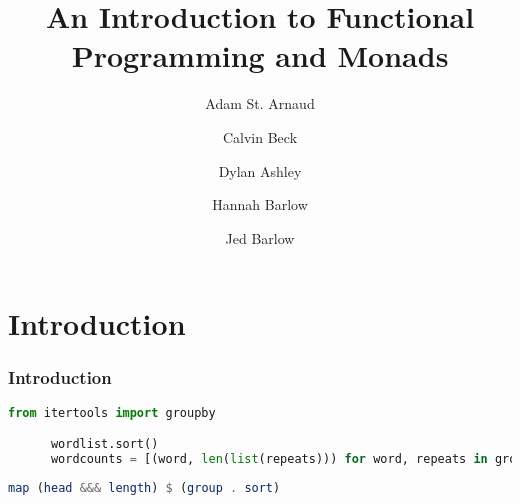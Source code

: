 \documentclass[]{beamer}
\title{An Introduction to Functional Programming and Monads}
\author{Adam St. Arnaud\\
  \and Calvin Beck\\
  \and Dylan Ashley\\
  \and Hannah Barlow\\
  \and Jed Barlow}
\begin{document}
\begin{frame}
\maketitle
\end{frame}

\section{Introduction}
\begin{frame}[fragile]
    \frametitle{Introduction}

    \begin{lstlisting}[frame=single,language=Python,breaklines=true]
      from itertools import groupby

      wordlist.sort()
      wordcounts = [(word, len(list(repeats))) for word, repeats in groupby(wordlist)]
    \end{lstlisting}

    \begin{lstlisting}[frame=single,language=Haskell,breaklines=true]
      map (head &&& length) $ (group . sort)
    \end{lstlisting}
\end{frame}
\end{document}
